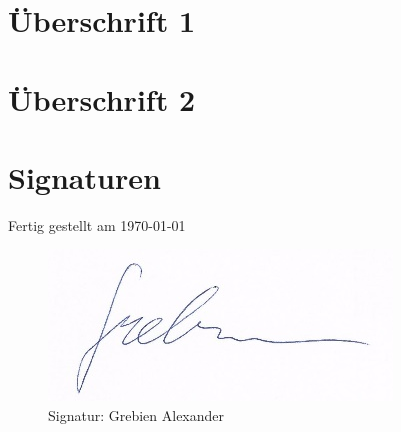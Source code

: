 \newcommand{\german}{true} %
\newcommand{\coloredTitlePage}{true} %
\newcommand{\company}{false}
\newcommand{\ECE}{true}

\usepackage{hyperref}

\makeglossaries

\makeatletter
\newcommand{\myscope}[2] %
{\draw[thick,rotate=#2] (#1) circle (12pt)
 (#1) ++(-0.35,-0.1) -- ++(0.3,0.3) --++(0,-0.3)-- ++(0.3,0.3) --++(0,-0.3);
}
\newcommand{\costumPicWidth}[0]{
0.8\textwidth
}

\newcommand{\costumPlotWidth}[0]{
\textwidth
}

\addto{}
\addto{}
\addto{}





\frontmatter
\renewcommand{\thepage}{\Roman{page}}



\tableofcontents
\printglossary
\mainmatter
\chapter{Überschrift 1}

\chapter{Überschrift 2}


\newpage
\chapter{Signaturen}
    Fertig gestellt am \today \\
    \begin{figure}[H]
        \centering
        \includegraphics{pics/signature_grebien.png}
    	\caption{Signatur: Grebien Alexander}
    	\label{pic:signatur_grebien}
    \end{figure}
        
\listoffigures
\listoftables



